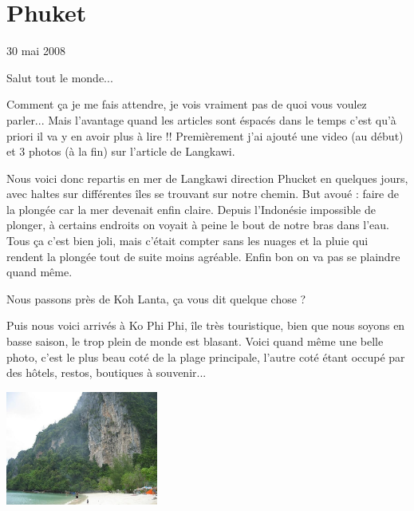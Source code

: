 \section{Phuket}

30 mai 2008

\begin{multicols}{2}

Salut tout le monde...

Comment ça je me fais attendre, je vois vraiment pas de quoi vous voulez parler... Mais l'avantage quand les articles sont éspacés dans le temps c'est qu'à priori il va y en avoir plus à lire !! Premièrement j'ai ajouté une video (au début) et 3 photos (à la fin) sur l'article de Langkawi.

Nous voici donc repartis en mer de Langkawi direction Phucket en quelques jours, avec haltes sur différentes îles se trouvant sur notre chemin. But avoué : faire de la plongée car la mer devenait enfin claire. Depuis l'Indonésie impossible de plonger, à certains endroits on voyait à peine le bout de notre bras dans l'eau. Tous ça c'est bien joli, mais c'était compter sans les nuages et la pluie qui rendent la plongée tout de suite moins agréable. Enfin bon on va pas se plaindre quand même.

Nous passons près de Koh Lanta, ça vous dit quelque chose ?


Puis nous voici arrivés à Ko Phi Phi, île très touristique, bien que nous soyons en basse saison, le trop plein de monde est blasant. Voici quand même une belle photo, c'est le plus beau coté de la plage principale, l'autre coté étant occupé par des hôtels, restos, boutiques à souvenir...

\smallbreak
\hspace*{-0.65cm}
\includegraphics[width=5cm]{articles/Phucket/12121623747QwQ.jpg}
\smallbreak


\end{multicols}
